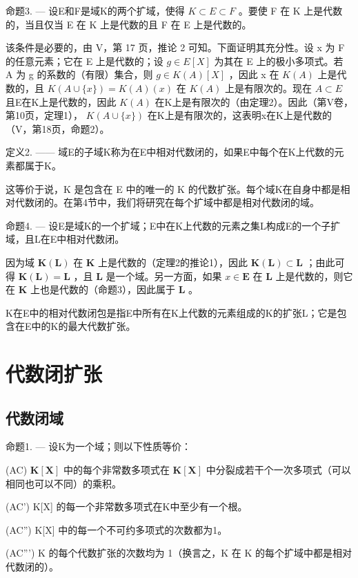 命题3. --- 设E和F是域K的两个扩域，使得 \(K \subset E \subset F\) 。要使 F 在 K 上是代数的，当且仅当 E 在 K 上是代数的且 F 在 E 上是代数的。

该条件是必要的，由 V，第 17 页，推论 2 可知。下面证明其充分性。设 x 为 F 的任意元素；它在 E 上是代数的；设 \(g \in E[X]\) 为其在 E 上的极小多项式。若 A 为 g 的系数的（有限）集合，则 \(g \in K(A)[X]\) ，因此 x 在 \(K(A)\) 上是代数的，且 \(K(A \cup \{x\}) = K(A)(x)\) 在 \(K(A)\) 上是有限次的。现在 \(A \subset E\) 且E在K上是代数的，因此 \(K(A)\) 在K上是有限次的（由定理2）。因此（第V卷，第10页，定理1）， \(K(A \cup \{x\})\) 在K上是有限次的，这表明x在K上是代数的（V，第18页，命题2）。

定义2. —— 域E的子域K称为在E中相对代数闭的，如果E中每个在K上代数的元素都属于K。

这等价于说，K 是包含在 E 中的唯一的 K 的代数扩张。每个域K在自身中都是相对代数闭的。在第4节中，我们将研究在每个扩域中都是相对代数闭的域。

命题4. --- 设E是域K的一个扩域；E中在K上代数的元素之集L构成E的一个子扩域，且L在E中相对代数闭。

因为域 \(\mathbf{K}(\mathbf{L})\) 在 \(\mathbf{K}\) 上是代数的（定理2的推论1），因此 \(\mathbf{K}(\mathbf{L}) \subset \mathbf{L}\) ；由此可得 \(\mathbf{K}(\mathbf{L}) = \mathbf{L}\) ，且 \(\mathbf{L}\) 是一个域。另一方面，如果 \(x \in \mathbf{E}\) 在 \(\mathbf{L}\) 上是代数的，则它在 \(\mathbf{K}\) 上也是代数的（命题3），因此属于 \(\mathbf{L}\) 。

K在E中的相对代数闭包是指E中所有在K上代数的元素组成的K的扩张L；它是包含在E中的K的最大代数扩张。

\section{代数闭扩张}

\subsection{代数闭域}

命题1. --- 设K为一个域；则以下性质等价：

(AC) \(\mathbf{K}[\mathbf{X}]\) 中的每个非常数多项式在 \(\mathbf{K}[\mathbf{X}]\) 中分裂成若干个一次多项式（可以相同也可以不同）的乘积。

(AC') K{[}X{]} 的每一个非常数多项式在K中至少有一个根。

(AC'') K{[}X{]} 中的每一个不可约多项式的次数都为1。

(AC''') K 的每个代数扩张的次数均为 1（换言之，K 在 K 的每个扩域中都是相对代数闭的）。


